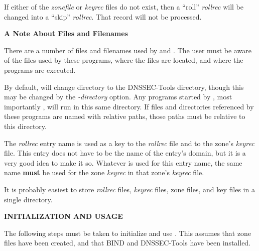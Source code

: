If either of the {\it zonefile} or {\it keyrec} files do not exist, then a
``roll'' {\it rollrec} will be changed into a ``skip'' {\it rollrec}.  That
record will not be processed.

\clearpage
{\bf A Note About Files and Filenames}

There are a number of files and filenames used by  and
.  The user must be aware of the files used by these programs,
where the files are located, and where the programs are executed.

By default,  will change directory to the DNSSEC-Tools directory,
though this may be changed by the {\it -directory} option.  Any programs
started by , most importantly , will run in this
same directory.  If files and directories referenced by these programs are
named with relative paths, those paths must be relative to this directory.

The {\it rollrec} entry name is used as a key to the {\it rollrec} file and to
the zone's {\it keyrec} file.  This entry does not have to be the name of the
entry's domain, but it is a very good idea to make it so.  Whatever is used
for this entry name, the same name {\bf must} be used for the zone
{\it keyrec} in that zone's {\it keyrec} file.

It is probably easiest to store {\it rollrec} files, {\it keyrec} files, zone
files, and key files in a single directory.

{\bf INITIALIZATION AND USAGE}

The following steps must be taken to initialize and use .  This
assumes that zone files have been created, and that BIND and DNSSEC-Tools
have been installed.

